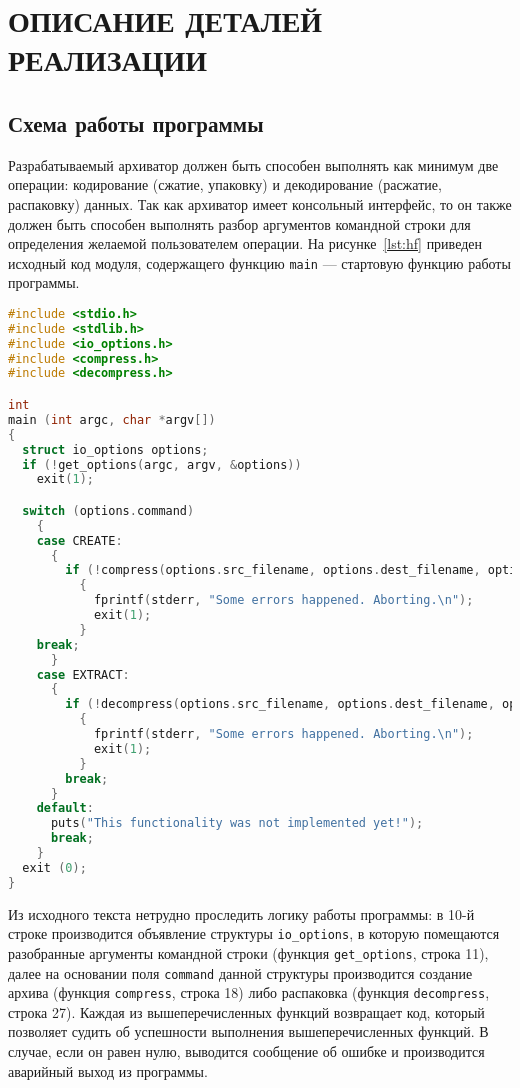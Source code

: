 \section[Описание деталей реализации]{ОПИСАНИЕ ДЕТАЛЕЙ РЕАЛИЗАЦИИ}
\label{sec:realization}

\subsection{Схема работы программы}

Разрабатываемый архиватор должен быть способен выполнять как минимум две
операции: кодирование (сжатие, упаковку) и декодирование (расжатие, распаковку)
данных.
Так как архиватор имеет консольный интерфейс, то он также должен быть способен
выполнять разбор аргументов командной строки для определения желаемой 
пользователем операции.
На рисунке~\ref{lst:hf} приведен исходный код модуля, содержащего функцию 
\texttt{main} --- стартовую функцию работы программы.

\begin{lstlisting}[basicstyle=\scriptsize\ttfamily,
                   numberstyle=\scriptsize\ttfamily,
                   xleftmargin=7mm,
                   language=C,caption=Исходный код функции main,
                   label=lst:hf]
#include <stdio.h>
#include <stdlib.h>
#include <io_options.h>
#include <compress.h>
#include <decompress.h>

int
main (int argc, char *argv[])
{
  struct io_options options;
  if (!get_options(argc, argv, &options))
    exit(1);

  switch (options.command)
    {
    case CREATE:
      {
        if (!compress(options.src_filename, options.dest_filename, options.verbose))
          {
            fprintf(stderr, "Some errors happened. Aborting.\n");
            exit(1);
          }
	break;
      }
    case EXTRACT:
      {
        if (!decompress(options.src_filename, options.dest_filename, options.verbose))
          {
            fprintf(stderr, "Some errors happened. Aborting.\n");
            exit(1);
          }
        break;
      }
    default:
      puts("This functionality was not implemented yet!");
      break;
    }
  exit (0);
}
\end{lstlisting}

Из исходного текста нетрудно проследить логику работы программы:
в 10-й строке производится объявление структуры \texttt{io\_options},
в которую помещаются разобранные аргументы командной строки
(функция \texttt{get\_options}, строка 11),
далее на основании поля \texttt{command} данной структуры производится
создание архива (функция \texttt{compress}, строка 18)
либо распаковка (функция \texttt{decompress}, строка 27).
Каждая из вышеперечисленных функций возвращает код, 
который позволяет судить об успешности выполнения вышеперечисленных функций.
В случае, если он равен нулю, выводится сообщение об ошибке и 
производится аварийный выход из программы.

